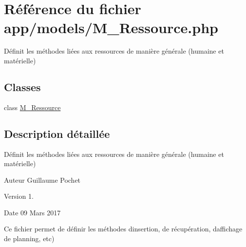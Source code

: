 \hypertarget{_m___ressource_8php}{}\section{Référence du fichier app/models/\+M\+\_\+\+Ressource.php}
\label{_m___ressource_8php}


Définit les méthodes liées aux ressources de manière générale (humaine et matérielle)  


\subsection*{Classes}
\begin{DoxyCompactItemize}
\item 
class \hyperlink{class_m___ressource}{M\+\_\+\+Ressource}
\end{DoxyCompactItemize}


\subsection{Description détaillée}
Définit les méthodes liées aux ressources de manière générale (humaine et matérielle) 

\begin{DoxyAuthor}{Auteur}
Guillaume Pochet 
\end{DoxyAuthor}
\begin{DoxyVersion}{Version}
1. 
\end{DoxyVersion}
\begin{DoxyDate}{Date}
09 Mars 2017
\end{DoxyDate}
Ce fichier permet de définir les méthodes d\textquotesingle{}insertion, de récupération, d\textquotesingle{}affichage de planning, etc) 